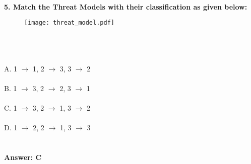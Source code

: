 \documentclass[prl,twocolumn,showpacs,preprintnumbers,superscriptaddress]{revtex4}
\theoremstyle{plain}
\theoremstyle{definition}
\begin{document}
\begin{widetext}
\\
\\
\\
\newpage
\textbf{5. Match the Threat Models with their classification as given below:}
\begin{figure}[H]
\begin{center}
    \texttt{[image: threat\_model.pdf]}
\end{center}
\end{figure}
\\
\\
\\
\noindent A. 1 $\rightarrow$ 1, 2 $\rightarrow$ 3, 3 $\rightarrow$ 2
\\
\\
B. 1 $\rightarrow$ 3, 2 $\rightarrow$ 2, 3 $\rightarrow$ 1
\\
\\
C. 1 $\rightarrow$ 3, 2 $\rightarrow$ 1, 3 $\rightarrow$ 2
\\
\\
D. 1 $\rightarrow$ 2, 2 $\rightarrow$ 1, 3 $\rightarrow$ 3
\\
\\
\\
\textbf{Answer: C}
\\
\\
\\
\\
\\
\\
\end{widetext}
\end{document}
